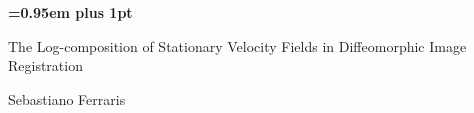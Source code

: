 \documentclass[a4paper,10pt]{book}
\theoremstyle{definition}
\begin{document}
\begin{titlepage}
%
\pagestyle{empty}
\begingroup
\vspace*{-7\topskip}

\vspace{2 cm}

\begin{center}
        {\huge\bf \baselineskip=0.95em plus 1pt \expandafter{
        The Log-composition of Stationary Velocity Fields in Diffeomorphic Image Registration
        \par}}
\end{center}

\vspace{0.5cm}
\begin{center}
	{\LARGE{Sebastiano Ferraris}\par}
\end{center}


\vspace{2cm}
\begin{figure}[!h]
\begin{center}
\end{center}
\end{figure}
\vspace{1.3cm}


\end{titlepage}
\end{document}
